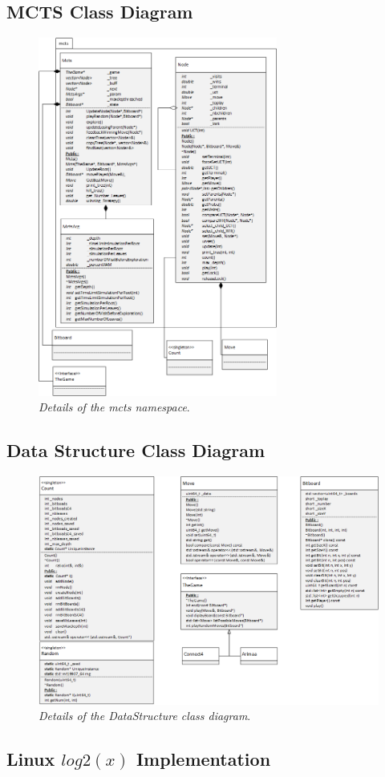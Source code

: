 \subsection{MCTS Class Diagram}
\begin{figure}[H] 
\centerline{\includegraphics[width=0.7\textwidth]{Annexes/Img/MCTS.png}}
\caption{\label{fig:mctsclassdiagram}\textit{Details of the mcts namespace}.}
\end{figure}

\subsection{Data Structure Class Diagram}
\begin{figure}[H] 
\centerline{\includegraphics[width=\textwidth]{Annexes/Img/DataStructure.png}}
\caption{\label{fig:datastructuredetails}\textit{Details of the DataStructure class diagram}.}
\end{figure}

\subsection{Linux \ensuremath{log2(x)} Implementation} \label{subsec:fastLog}

